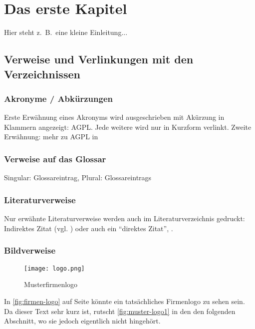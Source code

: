 
\chapter{Das erste Kapitel}
Hier steht z.\ B.\ eine kleine Einleitung...
\section{Verweise und Verlinkungen mit den Verzeichnissen}
\subsection{Akronyme / Abkürzungen}
Erste Erwähnung eines Akronyms wird ausgeschrieben mit Akürzung in Klammern angezeigt: \ac{AGPL}. Jede weitere wird nur in Kurzform verlinkt. Zweite Erwähnung: mehr zu \ac{AGPL} in \cite{fsf:2007}

\subsection{Verweise auf das Glossar}
Singular: \gls{Glossareintrag}, Plural: \glspl{Glossareintrag}

\subsection{Literaturverweise}
Nur erwähnte Literaturverweise werden auch im Literaturverzeichnis gedruckt:\\
Indirektes Zitat (vgl. \cite{baumgartner:2002}) oder auch ein ``direktes Zitat'', \cite{dreyfus:1980}.
\paragraph{}

\subsection{Bildverweise}
\begin{wrapfigure}{R}{.4\textwidth}
\texttt{[image: logo.png]}
\caption{Musterfirmenlogo \cite{mustermann:2012}}
\label{fig:muster-logo1}
\end{wrapfigure}
In \autoref{fig:firmen-logo} auf Seite \pageref{fig:firmen-logo} könnte ein tatsächliches Firmenlogo zu sehen sein. Da dieser Text sehr kurz ist, rutscht \autoref{fig:muster-logo1} in den den folgenden Abschnitt, wo sie jedoch eigentlich nicht hingehört.


